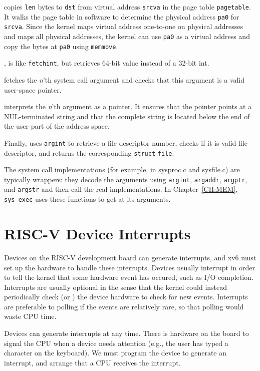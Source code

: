  copies \lstinline{len} bytes to
\lstinline{dst} from virtual address \lstinline{srcva} in the page
table \lstinline{pagetable}.  It walks the page table in software to
determine the physical address \lstinline{pa0} for \lstinline{srcva}.
Since the kernel maps virtual address one-to-one on physical
addresses and maps all physical addresses, the kernel can use
\lstinline{pa0} as a virtual address and copy the bytes at
\lstinline{pa0} using \lstinline{memmove}.

,
is like
\lstinline{fetchint},
but retrieves 64-bit value instead of a 32-bit int.

fetches the
\textit{n}'th 
system call argument and checks that this argument is a valid
user-space pointer.

interprets the
\textit{n}'th 
argument as a pointer.  It ensures that the pointer points at a
NUL-terminated string and that the complete string is located below
the end of the user part of the address space.

Finally,
uses
\lstinline{argint}
to retrieve a file descriptor number, checks if it is valid
file descriptor, and returns the corresponding
\lstinline{struct}
\lstinline{file}.

The system call implementations (for example, in sysproc.c and sysfile.c)
are typically wrappers: they decode the arguments using 
\lstinline{argint},
\lstinline{argaddr},
\lstinline{argptr}, 
and 
\lstinline{argstr}
and then call the real implementations.
In Chapter~\ref{CH:MEM},
\lstinline{sys_exec}
uses these functions to get at its arguments.

\section{RISC-V Device Interrupts}

Devices on the RISC-V development board can generate interrupts, and
xv6 must set up the hardware to handle these interrupts.  Devices
usually interrupt in order to tell the kernel that some hardware event
has occured, such as I/O completion.  Interrupts are usually optional
in the sense that the kernel could instead periodically check (or
) the device hardware to check for new
events.  Interrupts are preferable to polling if the events are
relatively rare, so that polling would waste CPU time.

Devices can generate interrupts
at any time.  There is hardware on the board to signal the CPU
when a device needs attention (e.g., the user has typed a character on
the keyboard). We must program the device to generate an interrupt, and
arrange that a CPU receives the interrupt. 

